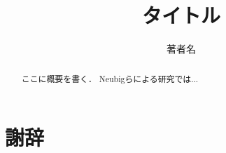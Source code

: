 \documentclass[system, bachelor]{systembt}%
\title{タイトル}
\author{著者名}
\begin{document}
\maketitle%

\frontmatter%



\begin{abstract}%
 ここに概要を書く．
 Neubigらによる研究\cite{KyTea}では...
\end{abstract}


{\makeatletter
\let\ps@jpl@in\ps@empty
\makeatother
\pagestyle{empty}
\tableofcontents
\clearpage}

\mainmatter%
\chapter{}

\backmatter%
\chapter{謝辞}%



\appendix%
\chapter{}
\end{document}
